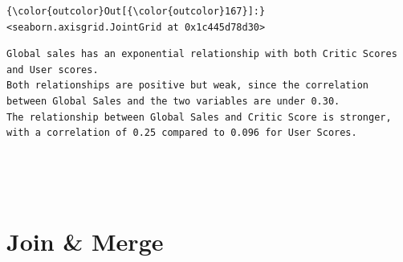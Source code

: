 \documentclass[11pt]{article}
\begin{document}
\begin{Verbatim}[commandchars=\\\{\}]
{\color{outcolor}Out[{\color{outcolor}167}]:} <seaborn.axisgrid.JointGrid at 0x1c445d78d30>
\end{Verbatim}
            
    \begin{Verbatim}[commandchars=\\\{\}]
Global sales has an exponential relationship with both Critic Scores and User scores.
Both relationships are positive but weak, since the correlation between Global Sales and the two variables are under 0.30.
The relationship between Global Sales and Critic Score is stronger, with a correlation of 0.25 compared to 0.096 for User Scores.

    \end{Verbatim}

    \begin{center}
    \end{center}
    { \hspace*{\fill} \\}
    
    \begin{center}
    \end{center}
    { \hspace*{\fill} \\}
    
    \section{Join \& Merge}\label{join-merge}

    
\end{document}
